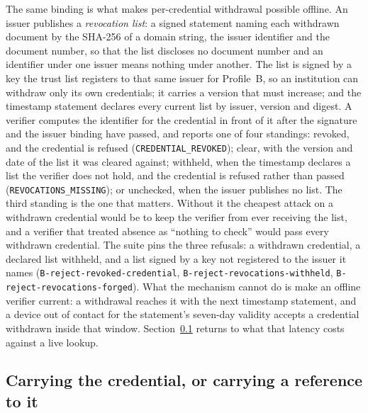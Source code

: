 \documentclass[10pt,a4paper,twocolumn]{article}
\newcommand{\code}[1]{\texttt{\small #1}}
\begin{document}
The same binding is what makes per-credential withdrawal possible offline. An
issuer publishes a \emph{revocation list}: a signed statement naming each
withdrawn document by the SHA-256 of a domain string, the issuer identifier
and the document number, so that the list discloses no document number and an
identifier under one issuer means nothing under another. The list is signed by
a key the trust list registers to that same issuer for Profile~B, so an
institution can withdraw only its own credentials; it carries a version that
must increase; and the timestamp statement declares every current list by
issuer, version and digest. A verifier computes the identifier for the
credential in front of it after the signature and the issuer binding have
passed, and reports one of four standings: revoked, and the credential is
refused (\code{CREDENTIAL\_REVOKED}); clear, with the version and date of the
list it was cleared against; withheld, when the timestamp declares a list the
verifier does not hold, and the credential is refused rather than passed
(\code{REVOCATIONS\_MISSING}); or unchecked, when the issuer publishes no
list. The third standing is the one that matters. Without it the cheapest
attack on a withdrawn credential would be to keep the verifier from ever
receiving the list, and a verifier that treated absence as ``nothing to
check'' would pass every withdrawn credential. The suite pins the three
refusals: a withdrawn credential, a declared list withheld, and a list signed
by a key not registered to the issuer it names
(\code{B-reject-\allowbreak revoked-\allowbreak credential},
\code{B-reject-\allowbreak revocations-\allowbreak withheld},
\code{B-reject-\allowbreak revocations-\allowbreak forged}). What the
mechanism cannot do is make an offline verifier current: a withdrawal reaches
it with the next timestamp statement, and a device out of contact for the
statement's seven-day validity accepts a credential withdrawn inside that
window. Section~\ref{sec:verifygov} returns to what that latency costs
against a live lookup.

\subsection{Carrying the credential, or carrying a reference to it}
\label{sec:verifygov}
\end{document}
